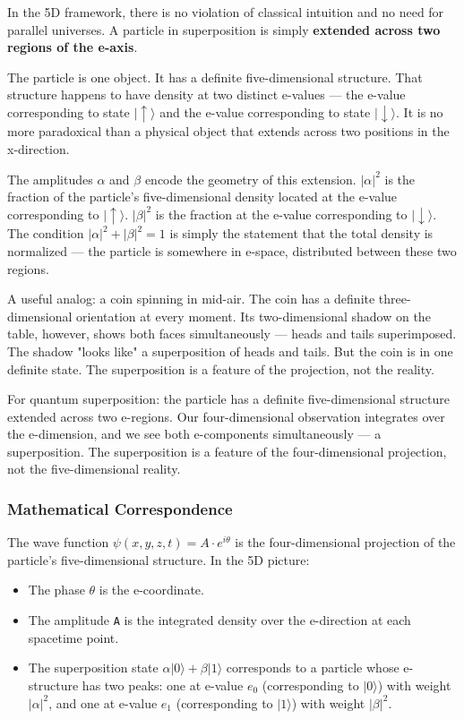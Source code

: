 \documentclass[aps,prd,preprint,superscriptaddress,longbibliography,floatfix]{revtex4-2}
\theoremstyle{remark}
\begin{document}
In the 5D framework, there is no violation of classical intuition and no need for parallel universes. A particle in superposition is simply \textbf{extended across two regions of the e-axis}.

The particle is one object. It has a definite five-dimensional structure. That structure happens to have density at two distinct e-values --- the e-value corresponding to state $|\uparrow\rangle$ and the e-value corresponding to state $|\downarrow\rangle$. It is no more paradoxical than a physical object that extends across two positions in the x-direction.

The amplitudes $\alpha$ and $\beta$ encode the geometry of this extension. $|\alpha|^{2}$ is the fraction of the particle's five-dimensional density located at the e-value corresponding to $|\uparrow\rangle$. $|\beta|^{2}$ is the fraction at the e-value corresponding to $|\downarrow\rangle$. The condition $|\alpha|^{2} + |\beta|^{2} = 1$ is simply the statement that the total density is normalized --- the particle is somewhere in e-space, distributed between these two regions.

A useful analog: a coin spinning in mid-air. The coin has a definite three-dimensional orientation at every moment. Its two-dimensional shadow on the table, however, shows both faces simultaneously --- heads and tails superimposed. The shadow "looks like" a superposition of heads and tails. But the coin is in one definite state. The superposition is a feature of the projection, not the reality.

For quantum superposition: the particle has a definite five-dimensional structure extended across two e-regions. Our four-dimensional observation integrates over the e-dimension, and we see both e-components simultaneously --- a superposition. The superposition is a feature of the four-dimensional projection, not the five-dimensional reality.


\subsubsection{Mathematical Correspondence}

The wave function $\psi(x, y, z, t) = A \cdot e^{i\theta}$ is the four-dimensional projection of the particle's five-dimensional structure. In the 5D picture:


\begin{itemize}
  \item The phase $\theta$ is the e-coordinate.
  \item The amplitude \texttt{A} is the integrated density over the e-direction at each spacetime point.
  \item The superposition state $\alpha|0\rangle + \beta|1\rangle$ corresponds to a particle whose e-structure has two peaks: one at e-value $e_{0}$ (corresponding to $|0\rangle$) with weight $|\alpha|^{2}$, and one at e-value $e_{1}$ (corresponding to $|1\rangle$) with weight $|\beta|^{2}$.
\end{itemize}
\end{document}
